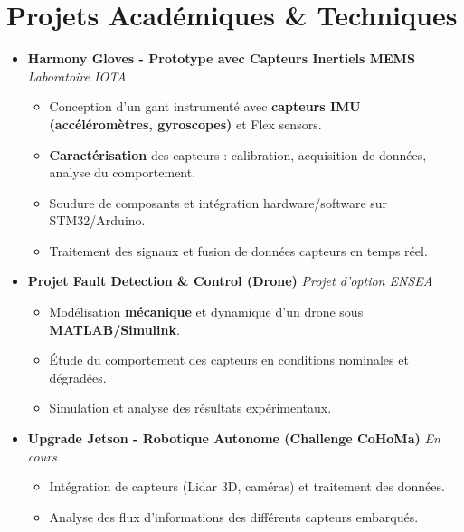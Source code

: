 \documentclass[a4paper,11pt]{article}
\begin{document}
\section{Projets Académiques \& Techniques}
\begin{itemize}[leftmargin=*, label={}]

\item \textbf{Harmony Gloves - Prototype avec Capteurs Inertiels MEMS} \hfill \textit{Laboratoire IOTA}
\vspace{-2pt}
    \begin{itemize}[leftmargin=0.4cm, nosep, label=\tiny$\bullet$]
        \item \small{Conception d'un gant instrumenté avec \textbf{capteurs IMU (accéléromètres, gyroscopes)} et Flex sensors.}
        \item \small{\textbf{Caractérisation} des capteurs : calibration, acquisition de données, analyse du comportement.}
        \item \small{Soudure de composants et intégration hardware/software sur STM32/Arduino.}
        \item \small{Traitement des signaux et fusion de données capteurs en temps réel.}
    \end{itemize}
    \vspace{3pt}

\item \textbf{Projet Fault Detection \& Control (Drone)} \hfill \textit{Projet d'option ENSEA}
\vspace{-2pt}
    \begin{itemize}[leftmargin=0.4cm, nosep, label=\tiny$\bullet$]
        \item \small{Modélisation \textbf{mécanique} et dynamique d'un drone sous \textbf{MATLAB/Simulink}.}
        \item \small{Étude du comportement des capteurs en conditions nominales et dégradées.}
        \item \small{Simulation et analyse des résultats expérimentaux.}
    \end{itemize}
    \vspace{3pt}

\item \textbf{Upgrade Jetson - Robotique Autonome (Challenge CoHoMa)} \hfill \textit{En cours}
\vspace{-2pt}
    \begin{itemize}[leftmargin=0.4cm, nosep, label=\tiny$\bullet$]
        \item \small{Intégration de capteurs (Lidar 3D, caméras) et traitement des données.}
        \item \small{Analyse des flux d'informations des différents capteurs embarqués.}
    \end{itemize}
    \vspace{3pt}


\end{itemize}
\end{document}
